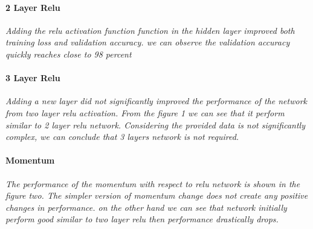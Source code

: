 \documentclass[a4 paper]{article}
\begin{document}
\paragraph{2 Layer Relu}\textit{Adding the relu activation function function in the hidden layer improved both training loss and validation accuracy. we can observe the validation accuracy quickly reaches close to 98 percent }

\paragraph{3 Layer Relu}\textit{Adding a new layer did not significantly improved the performance of the network from two layer relu activation. From the figure 1 we can see that it perform similar to 2 layer relu network. Considering the provided data is not significantly complex, we can conclude that 3 layers network is not required.}

\paragraph{Momentum}\textit{The performance of the momentum with respect to relu network is shown in the figure two. The simpler version of momentum change does not create any positive changes in performance. on the other hand we can see that network initially perform good similar to two layer relu then performance drastically drops.}
\end{document}
